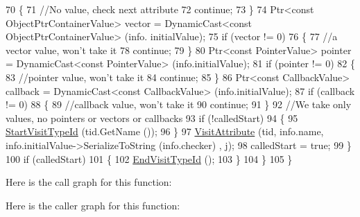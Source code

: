 \begin{DoxyCode}
70             \{
71               \textcolor{comment}{//No value, check next attribute}
72               \textcolor{keywordflow}{continue};
73             \}
74           Ptr<const ObjectPtrContainerValue> vector = DynamicCast<const ObjectPtrContainerValue> (info.
      initialValue);
75           \textcolor{keywordflow}{if} (vector != 0)
76             \{
77               \textcolor{comment}{//a vector value, won't take it}
78               \textcolor{keywordflow}{continue};
79             \}
80           Ptr<const PointerValue> pointer = DynamicCast<const PointerValue> (info.initialValue);
81           \textcolor{keywordflow}{if} (pointer != 0)
82             \{
83               \textcolor{comment}{//pointer value, won't take it}
84               \textcolor{keywordflow}{continue};
85             \}
86           Ptr<const CallbackValue> callback = DynamicCast<const CallbackValue> (info.initialValue);
87           \textcolor{keywordflow}{if} (callback != 0)
88             \{
89               \textcolor{comment}{//callback value, won't take it}
90               \textcolor{keywordflow}{continue};
91             \}
92           \textcolor{comment}{//We take only values, no pointers or vectors or callbacks}
93           \textcolor{keywordflow}{if} (!calledStart)
94             \{
95               \hyperlink{classns3_1_1AttributeDefaultIterator_ad83068183f54517ea6cc0065709f2c1f}{StartVisitTypeId} (tid.GetName ());
96             \}
97           \hyperlink{classns3_1_1AttributeDefaultIterator_a72a2497a0d333b1153b3ea9824d4defa}{VisitAttribute} (tid, info.name, info.initialValue->SerializeToString (info.checker)
      , j);
98           calledStart = \textcolor{keyword}{true};
99         \}
100       \textcolor{keywordflow}{if} (calledStart)
101         \{
102           \hyperlink{classns3_1_1AttributeDefaultIterator_a1362813a873760a03b966b99acd28e1b}{EndVisitTypeId} ();
103         \}
104     \}
105 \}
\end{DoxyCode}


Here is the call graph for this function\+:




Here is the caller graph for this function\+:


